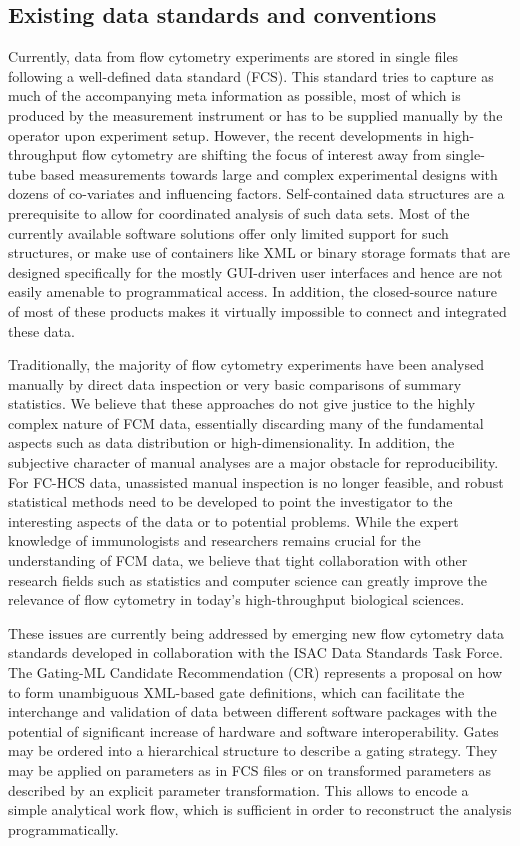 \documentclass[12pt]{article}
\begin{document}
\subsection{Existing data standards and conventions}
Currently, data from flow cytometry experiments are stored in single
files following a well-defined data standard (FCS). This standard
tries to capture as much of the accompanying meta information as
possible, most of which is produced by the measurement instrument or
has to be supplied manually by the operator upon experiment
setup. However, the recent developments in high-throughput flow
cytometry are shifting the focus of interest away from single-tube
based measurements towards large and complex experimental designs with
dozens of co-variates and influencing factors. Self-contained data
structures are a prerequisite to allow for coordinated analysis of
such data sets. Most of the currently available software solutions
offer only limited support for such structures, or make use of
containers like XML or binary storage formats that are designed
specifically for the mostly GUI-driven user interfaces and hence are
not easily amenable to programmatical access. In addition, the
closed-source nature of most of these products makes it virtually
impossible to connect and integrated these data. 

Traditionally, the majority of flow cytometry experiments have been
analysed manually by direct data inspection or very basic comparisons
of summary statistics. We believe that these approaches do not give
justice to the highly complex nature of FCM data, essentially
discarding many of the fundamental aspects such as data distribution
or high-dimensionality. In addition, the subjective character of
manual analyses are a major obstacle for reproducibility. For FC-HCS
data, unassisted manual inspection is no longer feasible, and robust
statistical methods need to be developed to point the investigator to
the interesting aspects of the data or to potential problems. While the
expert knowledge of immunologists and researchers remains crucial for
the understanding of FCM data, we believe that tight collaboration
with other research fields such as statistics and computer science can
greatly improve the relevance of flow cytometry in today's
high-throughput biological sciences.

These issues are currently being addressed by emerging new flow cytometry 
data standards developed in collaboration with the ISAC Data Standards Task Force. 
The Gating-ML Candidate Recommendation (CR) represents a proposal on how to form 
unambiguous XML-based gate definitions, which can facilitate the interchange and 
validation of data between different software packages with the potential of 
significant increase of hardware and software interoperability. Gates may be 
ordered into a hierarchical structure to describe a gating strategy. They may be 
applied on parameters as in FCS files or on transformed parameters as described 
by an explicit parameter transformation. This allows to encode a simple analytical 
work flow, which is sufficient in order to reconstruct the analysis programmatically.
\end{document}
